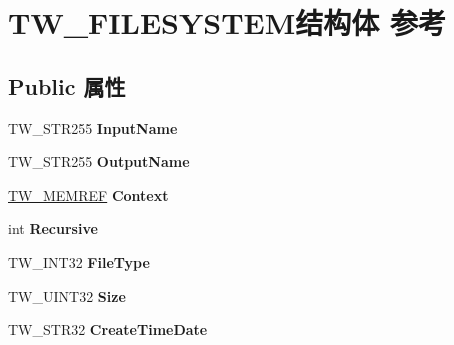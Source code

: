 \hypertarget{struct_t_w___f_i_l_e_s_y_s_t_e_m}{}\section{T\+W\+\_\+\+F\+I\+L\+E\+S\+Y\+S\+T\+E\+M结构体 参考}
\label{struct_t_w___f_i_l_e_s_y_s_t_e_m}
\subsection*{Public 属性}
\begin{DoxyCompactItemize}
\item 
\mbox{\label{struct_t_w___f_i_l_e_s_y_s_t_e_m_ada515c1f99bcdbb51436c27a626e07b5}} 
T\+W\+\_\+\+S\+T\+R255 {\bfseries Input\+Name}
\item 
\mbox{\label{struct_t_w___f_i_l_e_s_y_s_t_e_m_aca3ed99a4abd8ffc3c13e1de1a712595}} 
T\+W\+\_\+\+S\+T\+R255 {\bfseries Output\+Name}
\item 
\mbox{\label{struct_t_w___f_i_l_e_s_y_s_t_e_m_a00cafdfd970ed3db15a9cb04a675fb40}} 
\hyperlink{interfacevoid}{T\+W\+\_\+\+M\+E\+M\+R\+EF} {\bfseries Context}
\item 
\mbox{\label{struct_t_w___f_i_l_e_s_y_s_t_e_m_a644ef73e4654d80115c48123bdb9028c}} 
int {\bfseries Recursive}
\item 
\mbox{\label{struct_t_w___f_i_l_e_s_y_s_t_e_m_aeac484558c740f8a80c1648879b580ff}} 
T\+W\+\_\+\+I\+N\+T32 {\bfseries File\+Type}
\item 
\mbox{\label{struct_t_w___f_i_l_e_s_y_s_t_e_m_ab4e006cf25373dc8de316f6eacb77174}} 
T\+W\+\_\+\+U\+I\+N\+T32 {\bfseries Size}
\item 
\mbox{\label{struct_t_w___f_i_l_e_s_y_s_t_e_m_a8e0a98cf550739f6672af066d8fe8c02}} 
T\+W\+\_\+\+S\+T\+R32 {\bfseries Create\+Time\+Date}
\item 
\mbox{\label{struct_t_w___f_i_l_e_s_y_s_t_e_m_a343e370d4699209103d9ade364e21596}} 

\end{DoxyCompactItemize}
